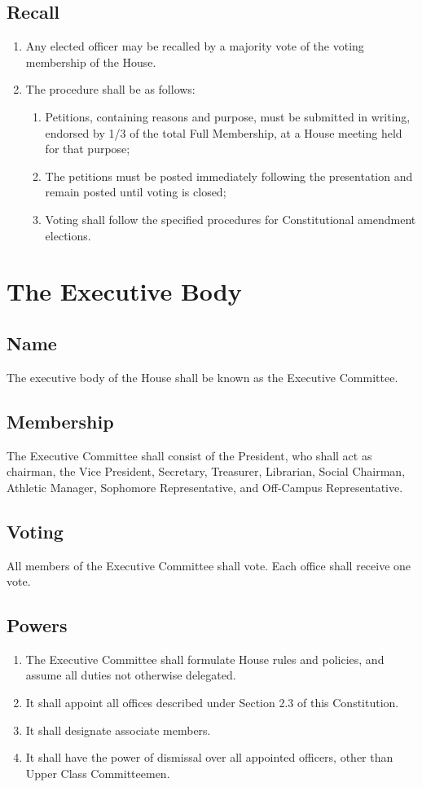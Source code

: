 \documentclass[10pt]{article} %
\begin{document}
\subsection{Recall}
\begin{enumerate}
\item Any elected officer may be recalled by a majority vote of the voting membership of the House. 
\item The procedure shall be as follows:
\begin{enumerate}
\item Petitions, containing reasons and purpose, must be submitted in writing, endorsed by 1/3 of the total Full Membership, at a House meeting held for that purpose;
\item The petitions must be posted immediately following the presentation and remain posted until voting is closed;
\item Voting shall follow the specified procedures for Constitutional amendment elections.
\end{enumerate}
\end{enumerate}
\section{The Executive Body}
\subsection{Name}
The executive body of the House shall be known as the Executive Committee.
\subsection{Membership}
The Executive Committee shall consist of the President, who shall act as chairman, the Vice President, Secretary, Treasurer, Librarian, Social Chairman, Athletic Manager, Sophomore Representative, and Off-Campus Representative.
\subsection{Voting}
All members of the Executive Committee shall vote. Each office shall receive one vote.
\subsection{Powers}
\begin{enumerate}
\item The Executive Committee shall formulate House rules and policies, and assume all duties not otherwise delegated.
\item It shall appoint all offices described under Section 2.3 of this Constitution.
\item It shall designate associate members.
\item It shall have the power of dismissal over all appointed officers, other than Upper Class Committeemen.
\end{enumerate}
\end{document}
